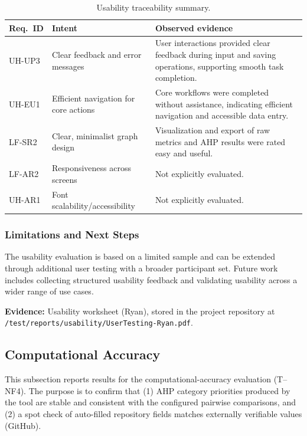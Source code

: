 \documentclass[12pt, titlepage]{article}
\begin{document}
\begin{table}[H]
  \centering
  \caption{Usability traceability summary.}
  \label{tab:usability-trace}
  \begin{tabular}{@{}p{}p{}p{}@{}}
    \toprule
    \textbf{Req.\ ID} & \textbf{Intent} & \textbf{Observed evidence} \\
    \midrule
    UH-UP3 &
      Clear feedback and error messages &
      User interactions provided clear feedback during input and saving
      operations, supporting smooth task completion. \\
    UH-EU1 &
      Efficient navigation for core actions &
      Core workflows were completed without assistance, indicating efficient
      navigation and accessible data entry. \\
    LF-SR2 &
      Clear, minimalist graph design &
      Visualization and export of raw metrics and AHP results were rated easy
      and useful. \\
    LF-AR2 &
      Responsiveness across screens &
      Not explicitly evaluated. \\
    UH-AR1 &
      Font scalability/accessibility &
      Not explicitly evaluated. \\
    \bottomrule
  \end{tabular}
\end{table}

\subsubsection{Limitations and Next Steps}
The usability evaluation is based on a limited sample and can be extended
through additional user testing with a broader participant set. Future work
includes collecting structured usability feedback and validating usability
across a wider range of use cases.

\noindent \textbf{Evidence:} Usability worksheet (Ryan), stored in the project
repository at \texttt{/test/reports/usability/UserTesting-Ryan.pdf}.

\subsection{Computational Accuracy}
\label{sec:nfr-comp-accuracy}

This subsection reports results for the computational-accuracy
evaluation (T--NF4).  The purpose is to confirm that (1) AHP category
priorities produced by the tool are stable and consistent with the configured
pairwise comparisons, and (2) a spot check of auto-filled repository fields
matches externally verifiable values (GitHub).
\end{document}
